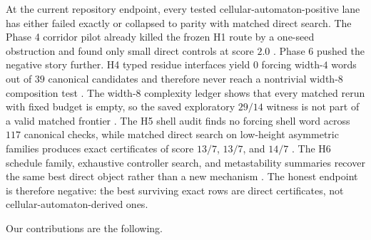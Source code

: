\documentclass[11pt]{article}
\theoremstyle{definition}
\begin{document}
At the current repository endpoint, every tested cellular-automaton-positive lane has either failed exactly or collapsed to parity with matched direct search. The Phase 4 corridor pilot already killed the frozen \textsc{H1} route by a one-seed obstruction and found only small direct controls at score $2.0$ \citep{archivara_h1_obstruction,archivara_h1_frontier,archivara_h2}. Phase 6 pushed the negative story further. \textsc{H4} typed residue interfaces yield $0$ forcing width-$4$ words out of $39$ canonical candidates and therefore never reach a nontrivial width-$8$ composition test \citep{archivara_h4_typed_interfaces}. The width-$8$ complexity ledger shows that every matched rerun with fixed budget is empty, so the saved exploratory $29/14$ witness is not part of a valid matched frontier \citep{archivara_complexity_frontier}. The \textsc{H5} shell audit finds no forcing shell word across $117$ canonical checks, while matched direct search on low-height asymmetric families produces exact certificates of score $13/7$, $13/7$, and $14/7$ \citep{archivara_h5_affine_shell}. The \textsc{H6} schedule family, exhaustive controller search, and metastability summaries recover the same best direct object rather than a new mechanism \citep{archivara_h6_defect_transport,archivara_boundary_controller,archivara_metastability}. The honest endpoint is therefore negative: the best surviving exact rows are direct certificates, not cellular-automaton-derived ones.

Our contributions are the following.
\end{document}
